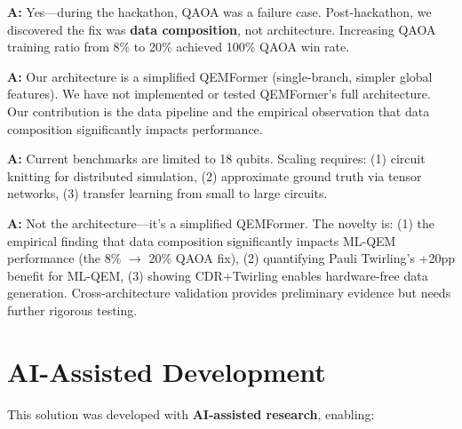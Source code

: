 \documentclass[11pt, a4paper]{article}
\begin{document}
\begin{tcolorbox}[colback=gray!5!white, colframe=gray!75!black, title=Q2: Your hackathon QAOA results were poor. Isn't that a failure?]
\textbf{A:} Yes---during the hackathon, QAOA was a failure case. Post-hackathon,
we discovered the fix was \textbf{data composition}, not architecture. Increasing
QAOA training ratio from 8\% to 20\% achieved 100\% QAOA win rate.
\end{tcolorbox}

\begin{tcolorbox}[colback=gray!5!white, colframe=gray!75!black, title=Q3: How does this compare to QEMFormer?]
\textbf{A:} Our architecture is a simplified QEMFormer (single-branch, simpler
global features). We have not implemented or tested QEMFormer's full
architecture. Our contribution is the data pipeline and the empirical
observation that data composition significantly impacts performance.
\end{tcolorbox}

\begin{tcolorbox}[colback=gray!5!white, colframe=gray!75!black, title=Q4: How does this scale to 100+ qubits?]
\textbf{A:} Current benchmarks are limited to 18 qubits. Scaling requires:
(1) circuit knitting for distributed simulation, (2) approximate ground truth
via tensor networks, (3) transfer learning from small to large circuits.
\end{tcolorbox}

\begin{tcolorbox}[colback=gray!5!white, colframe=gray!75!black, title=Q5: What's novel about your approach?]
\textbf{A:} Not the architecture---it's a simplified QEMFormer. The novelty
is: (1) the empirical finding that data composition significantly impacts
ML-QEM performance (the 8\% $\rightarrow$ 20\% QAOA fix), (2) quantifying
Pauli Twirling's +20pp benefit for ML-QEM, (3) showing CDR+Twirling enables
hardware-free data generation. Cross-architecture validation provides
preliminary evidence but needs further rigorous testing.
\end{tcolorbox}

\section{AI-Assisted Development}
\label{sec:ai}

This solution was developed with \textbf{AI-assisted research}, enabling:
\end{document}
